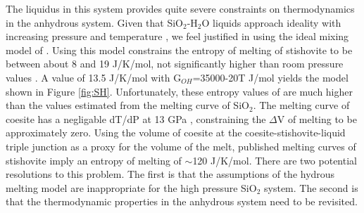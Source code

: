 \documentclass[review]{elsarticle}
\begin{document}
The liquidus in this system provides quite severe constraints on thermodynamics in the anhydrous system. Given that SiO$_2$-H$_2$O liquids approach ideality with increasing pressure and temperature \citep{HM2012}, we feel justified in using the ideal mixing model of \cite{SS1985}. Using this model constrains the entropy of melting of stishovite to be between about 8 and 19 J/K/mol, not significantly higher than room pressure values \citep{HM2012,ZLGHF1993}. A value of 13.5 J/K/mol with G$_{OH}$=35000-20T J/mol yields the model shown in Figure  \ref{fig:SH}. Unfortunately, these entropy values of are much higher than the values estimated from the melting curve of SiO$_2$. The melting curve of coesite has a negligable dT/dP at 13 GPa \citep{ZLGHF1993}, constraining the $\Delta$V of melting to be approximately zero. Using the volume of coesite at the coesite-stishovite-liquid triple junction as a proxy for the volume of the melt, published melting curves of stishovite \citep{Millotetal2015, ZLGHF1993} imply an entropy of melting of $\sim$120 J/K/mol. There are two potential resolutions to this problem. The first is that the assumptions of the hydrous melting model are inappropriate for the high pressure SiO$_2$ system. The second is that the thermodynamic properties in the anhydrous system need to be revisited. 


\end{document}
